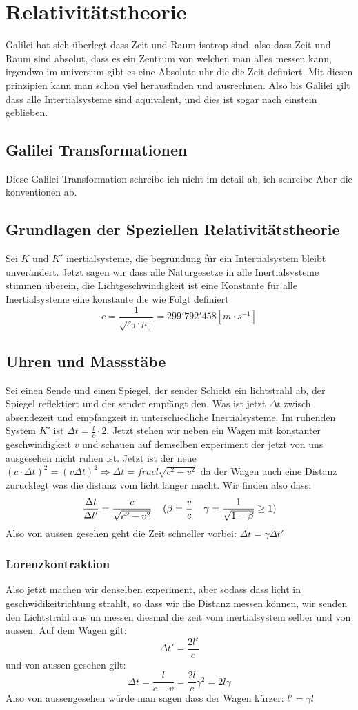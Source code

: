 \documentclass{article}
\newcommand{\mspc}{\hspace{0.4cm}}
\begin{document}
\section{Relativitätstheorie}
Galilei hat sich überlegt dass Zeit und Raum isotrop sind, also dass Zeit und Raum sind absolut, dass es ein Zentrum von welchen man alles messen kann, irgendwo im universum gibt es eine Absolute uhr die die Zeit definiert. Mit diesen prinzipien kann
man schon viel herausfinden und ausrechnen. Also bis Galilei gilt dass alle Intertialsysteme sind äquivalent, und dies ist sogar nach einstein geblieben.
\subsection{Galilei Transformationen}
Diese Galilei Transformation schreibe ich nicht im detail ab, ich schreibe Aber die konventionen ab.
\subsection{Grundlagen der Speziellen Relativitätstheorie} 
Sei $K$ und $K'$ inertialsysteme, die begründung für ein Intertialsystem bleibt unverändert. Jetzt sagen wir dass alle Naturgesetze in alle Inertialsysteme stimmen überein, die Lichtgeschwindigkeit ist eine Konstante für alle Inertialsysteme eine konstante die wie Folgt definiert\[c=\frac{1}{\sqrt{\varepsilon_0\cdot\mu_0}}=299'792'458[m\cdot s^{-1}]\]
\subsection{Uhren und Massstäbe}Sei einen Sende und einen Spiegel, der sender Schickt ein lichtstrahl ab, der Spiegel reflektiert und der sender empfängt den. Was ist jetzt $\Delta t$ zwisch absendezeit und empfangzeit in unterschiedliche Inertialsysteme.
Im ruhenden System $K'$ ist $\Delta t=\frac{l}{c}\cdot 2$. Jetzt stehen wir neben ein Wagen mit konstanter geschwindigkeit $v$ und schauen auf demselben experiment der jetzt von uns ausgesehen nicht ruhen ist. Jetzt ist der neue $(c\cdot\Delta t)^2=(v\Delta t) ^2\Rightarrow\Delta t=frac{l}{\sqrt{c^2-v^2}}$ da der Wagen auch eine Distanz zurucklegt was die distanz vom licht länger macht.
Wir finden also dass:
\[\frac{\Delta t}{\Delta t'}=\frac{c}{\sqrt{c^2- v^2}}\mspc (\beta=\frac{v}{c}\mspc \gamma=\frac{1}{\sqrt{1-\beta}}\ge1)\]
Also von aussen gesehen geht die Zeit schneller vorbei: $\Delta t =\gamma \Delta t'$
\subsubsection{Lorenzkontraktion} Also jetzt machen wir denselben experiment, aber sodass dass licht in geschwidikeitrichtung strahlt, so dass wir die Distanz messen können, wir senden den Lichtstrahl aus un messen diesmal die zeit vom inertialsystem selber und von aussen.
Auf dem Wagen gilt:
\[\Delta t'=\frac{2l'}{c}\]
und von aussen gesehen gilt:
\[\Delta t=\frac{l}{c-v}=\frac{2l}{c}\gamma^2=2l\gamma\]
Also von aussengesehen würde man sagen dass der Wagen kürzer: $l'=\gamma l$
\end{document}
